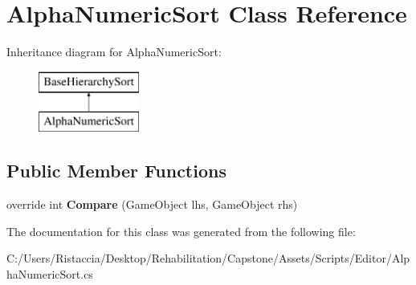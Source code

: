 \hypertarget{class_alpha_numeric_sort}{}\section{Alpha\+Numeric\+Sort Class Reference}
\label{class_alpha_numeric_sort}
Inheritance diagram for Alpha\+Numeric\+Sort\+:\begin{figure}[H]
\begin{center}
\leavevmode
\includegraphics[height=2.000000cm]{class_alpha_numeric_sort}
\end{center}
\end{figure}
\subsection*{Public Member Functions}
\begin{DoxyCompactItemize}
\item 
\mbox{\label{class_alpha_numeric_sort_a2f736ade40238711ea3f4048202c8477}} 
override int {\bfseries Compare} (Game\+Object lhs, Game\+Object rhs)
\end{DoxyCompactItemize}


The documentation for this class was generated from the following file\+:\begin{DoxyCompactItemize}
\item 
C\+:/\+Users/\+Ristaccia/\+Desktop/\+Rehabilitation/\+Capstone/\+Assets/\+Scripts/\+Editor/Alpha\+Numeric\+Sort.\+cs\end{DoxyCompactItemize}
